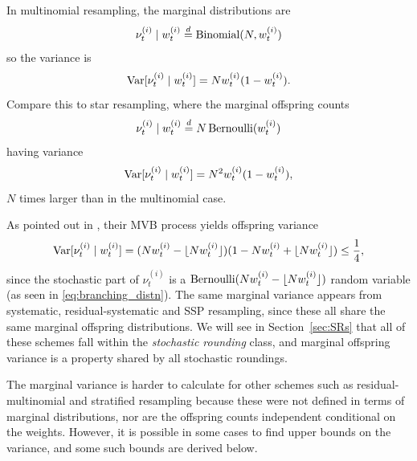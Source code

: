 In multinomial resampling, the marginal distributions are
\begin{equation*}
\nu_t^{(i)} \mid w_t^{(i)} 
\overset{d}{=} \operatorname{Binomial}(N, w_t^{(i)})
\end{equation*}
so the variance is
\begin{equation*}
\operatorname{Var}[ \nu_t^{(i)} \mid w_t^{(i)} ]
= N w_t^{(i)} ( 1- w_t^{(i)} ) .
\end{equation*}
Compare this to star resampling, where the marginal offspring counts
\begin{equation*}
\nu_t^{(i)} \mid w_t^{(i)} 
\overset{d}{=} N \operatorname{Bernoulli}( w_t^{(i)} )
\end{equation*}
having variance
\begin{equation*}
\operatorname{Var}[ \nu_t^{(i)} \mid w_t^{(i)} ]
= N^2 w_t^{(i)} ( 1- w_t^{(i)} ) ,
\end{equation*}
$N$ times larger than in the multinomial case.

As pointed out in \textcite[p.557]{crisan1999}, their MVB process yields offspring variance
\begin{equation*}
\operatorname{Var}[ \nu_t^{(i)} \mid w_t^{(i)} ]
= ( Nw_t^{(i)} -\lfloor N w_t^{(i)} \rfloor )(1- Nw_t^{(i)} + \lfloor N w_t^{(i)} \rfloor) 
\leq \frac{1}{4} ,
\end{equation*}
since the stochastic part of $\nu_t^{(i)}$ is a $\operatorname{Bernoulli}( Nw_t^{(i)} -\lfloor N w_t^{(i)} \rfloor )$ random variable (as seen in \eqref{eq:branching_distn}).
The same marginal variance appears from systematic, residual-systematic and SSP resampling, since these all share the same marginal offspring distributions. We will see in Section~\ref{sec:SRs} that all of these schemes fall within the \emph{stochastic rounding} class, and marginal offspring variance is a property shared by all stochastic roundings.

The marginal variance is harder to calculate for other schemes such as residual-multi\-nomial and stratified resampling because these were not defined in terms of marginal distributions, nor are the offspring counts independent conditional on the weights.
However, it is possible in some cases to find upper bounds on the variance, and some such bounds are derived below.

